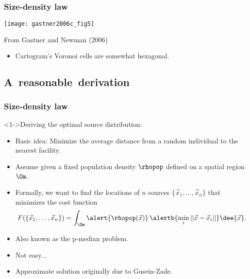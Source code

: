 \begin{frame}
  \frametitle{Size-density law}

  \texttt{[image: gastner2006c\_fig5]}

  {\small
    From Gastner and Newman (2006)\cite{gastner2006c}
  }
  \begin{itemize}
  \item Cartogram's Voronoi cells are somewhat hexagonal.
  \end{itemize}
  
\end{frame}

\subsection{A\ reasonable\ derivation}

\begin{frame}
  \frametitle{Size-density law}

  \begin{block}<1->{Deriving the optimal source distribution:}
    \begin{itemize}
    \item<2-> \alert{Basic idea:} Minimize the average distance
      from a random individual to the nearest facility.\cite{gastner2006c}
    \item<3-> Assume given a fixed population density $\rhopop$ defined
      on a spatial region $\Om$.
    \item<4-> Formally, we want to find the locations of 
      \alert{$n$ sources} $\{\vec{x}_1,\ldots,\vec{x}_n\}$
      that minimizes the \alert{cost function}
      $$
      F(\{\vec{x}_1,\ldots,\vec{x}_n\})
      =
      \int_{\Om}
      \alert{\rhopop(\vec{x})}
      \,
      \alertb{\min_{i}
      || \vec{x} - \vec{x}_i ||}
      \dee{\vec{x}}.
      $$
    \item<5-> Also known as the p-median problem.
    \item<6-> Not easy...  
    \item<7-> Approximate solution originally due to
      Gusein-Zade\cite{gusein-zade1982a}.
    \end{itemize}
  \end{block}

\end{frame}

